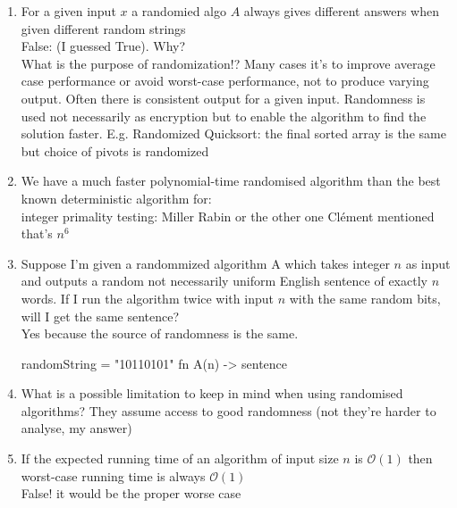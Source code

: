 \begin{enumerate}
    \item For a given input $x$ a randomied algo $A$ always gives different answers when given different random strings \\
    False: (I guessed True). Why? \\
    
    What is the purpose of randomization!? Many cases it's to improve average case performance or avoid worst-case performance, not to produce varying output.
    Often there is consistent output for a given input. Randomness is used not necessarily as encryption but to enable the algorithm to find the solution faster.
    E.g. Randomized Quicksort: the final sorted array is the same but choice of pivots is randomized
    

    \item We have a much faster polynomial-time randomised algorithm than the best known deterministic algorithm for:\\
    integer primality testing: Miller Rabin or the other one Clément mentioned that's $n^6$
    
    \item Suppose I'm given a randommized algorithm A which takes integer $n$ as input and outputs a random not necessarily uniform English sentence of exactly $n$ words. If I run the algorithm twice with input $n$ with the same random bits, will I get the same sentence? \\
    Yes because the source of randomness is the same.

    randomString = "10110101"
    fn A(n) -> sentence {

    }

    \item What is a possible limitation to keep in mind when using randomised algorithms?
    They assume access to good randomness (not they're harder to analyse, my answer)
    
    \item If the expected running time of an algorithm of input size $n$ is $\mathcal{O}(1)$ then worst-case running time is always $\mathcal{O}(1)$ \\
    False! it would be the proper worse case 


\end{enumerate}